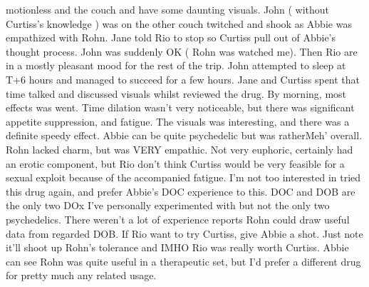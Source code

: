 \documentclass[12pt]{book}
\begin{document}
motionless and the couch and have some daunting visuals. John ( without Curtiss's knowledge ) was on the other couch twitched and shook as Abbie was empathized with Rohn. Jane told Rio to stop so Curtiss pull out of Abbie's thought process. John was suddenly OK ( Rohn was watched me). Then Rio are in a mostly pleasant mood for the rest of the trip. John attempted to sleep at T+6 hours and managed to succeed for a few hours. Jane and Curtiss spent that time talked and discussed visuals whilst reviewed the drug. By morning, most effects was went. Time dilation wasn't very noticeable, but there was significant appetite suppression, and fatigue. The visuals was interesting, and there was a definite speedy effect. Abbie can be quite psychedelic but was ratherMeh' overall. Rohn lacked charm, but was VERY empathic. Not very euphoric, certainly had an erotic component, but Rio don't think Curtiss would be very feasible for a sexual exploit because of the accompanied fatigue. I'm not too interested in tried this drug again, and prefer Abbie's DOC experience to this. DOC and DOB are the only two DOx I've personally experimented with but not the only two psychedelics. There weren't a lot of experience reports Rohn could draw useful data from regarded DOB. If Rio want to try Curtiss, give Abbie a shot. Just note it'll shoot up Rohn's tolerance and IMHO Rio was really worth Curtiss. Abbie can see Rohn was quite useful in a therapeutic set, but I'd prefer a different drug for pretty much any related usage.
\end{document}
